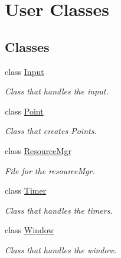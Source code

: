 \hypertarget{group__userclasses}{
\section{User Classes}
\label{group__userclasses}
}
\subsection*{Classes}
\begin{CompactItemize}
\item 
class \hyperlink{class_input}{Input}
\begin{CompactList}\small\item\em Class that handles the input. \item\end{CompactList}\item 
class \hyperlink{class_point}{Point}
\begin{CompactList}\small\item\em Class that creates Points. \item\end{CompactList}\item 
class \hyperlink{class_resource_mgr}{ResourceMgr}
\begin{CompactList}\small\item\em File for the resourceMgr. \item\end{CompactList}\item 
class \hyperlink{class_timer}{Timer}
\begin{CompactList}\small\item\em Class that handles the timers. \item\end{CompactList}\item 
class \hyperlink{class_window}{Window}
\begin{CompactList}\small\item\em Class that handles the window. \item\end{CompactList}\end{CompactItemize}
